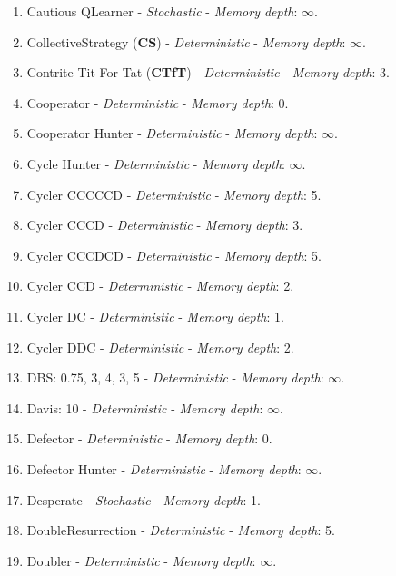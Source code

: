 \documentclass[10pt,letterpaper]{article}
\begin{document}
\begin{enumerate}
\item Cautious QLearner - \textit{Stochastic} - \textit{Memory depth}: \(\infty\). \cite{axelrodproject}
\item CollectiveStrategy (\textbf{CS}) - \textit{Deterministic} - \textit{Memory depth}: \(\infty\). \cite{Li2009}
\item Contrite Tit For Tat (\textbf{CTfT}) - \textit{Deterministic} - \textit{Memory depth}: 3. \cite{Axelrod1995}
\item Cooperator - \textit{Deterministic} - \textit{Memory depth}: 0. \cite{Axelrod1984, Mittal2009, Press2012}
\item Cooperator Hunter - \textit{Deterministic} - \textit{Memory depth}: \(\infty\). \cite{axelrodproject}
\item Cycle Hunter - \textit{Deterministic} - \textit{Memory depth}: \(\infty\). \cite{axelrodproject}
\item Cycler CCCCCD - \textit{Deterministic} - \textit{Memory depth}: 5. \cite{axelrodproject}
\item Cycler CCCD - \textit{Deterministic} - \textit{Memory depth}: 3. \cite{axelrodproject}
\item Cycler CCCDCD - \textit{Deterministic} - \textit{Memory depth}: 5. \cite{axelrodproject}
\item Cycler CCD - \textit{Deterministic} - \textit{Memory depth}: 2. \cite{Mittal2009}
\item Cycler DC - \textit{Deterministic} - \textit{Memory depth}: 1. \cite{axelrodproject}
\item Cycler DDC - \textit{Deterministic} - \textit{Memory depth}: 2. \cite{Mittal2009}
\item DBS: 0.75, 3, 4, 3, 5 - \textit{Deterministic} - \textit{Memory depth}: \(\infty\). \cite{Au2006}
\item Davis: 10 - \textit{Deterministic} - \textit{Memory depth}: \(\infty\). \cite{Axelrod1980}
\item Defector - \textit{Deterministic} - \textit{Memory depth}: 0. \cite{Axelrod1984, Mittal2009, Press2012}
\item Defector Hunter - \textit{Deterministic} - \textit{Memory depth}: \(\infty\). \cite{axelrodproject}
\item Desperate - \textit{Stochastic} - \textit{Memory depth}: 1. \cite{Berg2015}
\item DoubleResurrection - \textit{Deterministic} - \textit{Memory depth}: 5. \cite{Eckhart2015}
\item Doubler - \textit{Deterministic} - \textit{Memory depth}: \(\infty\). \cite{Prison1998}

\end{enumerate}
\end{document}
